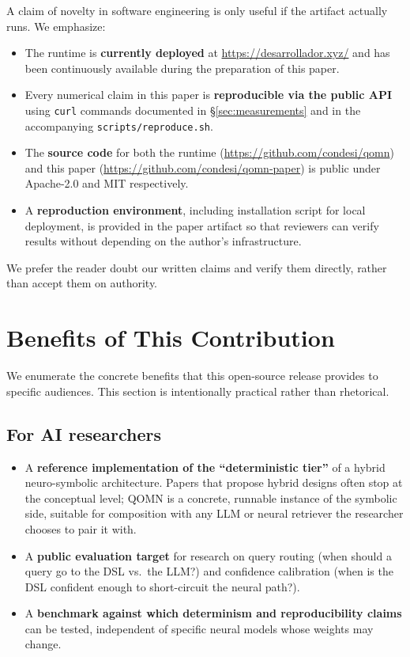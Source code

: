 \documentclass[11pt,a4paper]{article}
\begin{document}
A claim of novelty in software engineering is only useful if the artifact actually runs. We emphasize:

\begin{itemize}[leftmargin=*]
\item The runtime is \textbf{currently deployed} at \url{https://desarrollador.xyz/} and has been continuously available during the preparation of this paper.
\item Every numerical claim in this paper is \textbf{reproducible via the public API} using \texttt{curl} commands documented in \S\ref{sec:measurements} and in the accompanying \texttt{scripts/reproduce.sh}.
\item The \textbf{source code} for both the runtime (\url{https://github.com/condesi/qomn}) and this paper (\url{https://github.com/condesi/qomn-paper}) is public under Apache-2.0 and MIT respectively.
\item A \textbf{reproduction environment}, including installation script for local deployment, is provided in the paper artifact so that reviewers can verify results without depending on the author's infrastructure.
\end{itemize}

We prefer the reader doubt our written claims and verify them directly, rather than accept them on authority.

\section{Benefits of This Contribution}
\label{sec:benefits}

We enumerate the concrete benefits that this open-source release provides to specific audiences. This section is intentionally practical rather than rhetorical.

\subsection{For AI researchers}

\begin{itemize}[leftmargin=*]
\item A \textbf{reference implementation of the ``deterministic tier''} of a hybrid neuro-symbolic architecture. Papers that propose hybrid designs often stop at the conceptual level; QOMN is a concrete, runnable instance of the symbolic side, suitable for composition with any LLM or neural retriever the researcher chooses to pair it with.
\item A \textbf{public evaluation target} for research on query routing (when should a query go to the DSL vs.\ the LLM?) and confidence calibration (when is the DSL confident enough to short-circuit the neural path?).
\item A \textbf{benchmark against which determinism and reproducibility claims} can be tested, independent of specific neural models whose weights may change.
\end{itemize}
\end{document}
